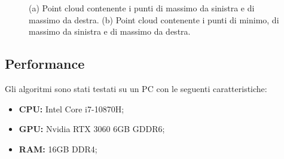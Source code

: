 \begin{figure}[H]
	\centering
	\hspace{1em}
	\caption{(a) Point cloud contenente i punti di massimo da sinistra e di massimo da destra. (b) Point cloud contenente i punti di minimo, di massimo da sinistra e di massimo da destra.}\label{fig:battistrada_maxr_maxl_0.3}
\end{figure}

\subsection{Performance} \label{performance}
Gli algoritmi sono stati testati su un PC con le seguenti caratteristiche:

\begin{itemize}
	\item \textbf{CPU:} Intel Core i7-10870H;
	\item \textbf{GPU:} Nvidia RTX 3060 6GB GDDR6;
	\item \textbf{RAM:} 16GB DDR4;
\end{itemize}

